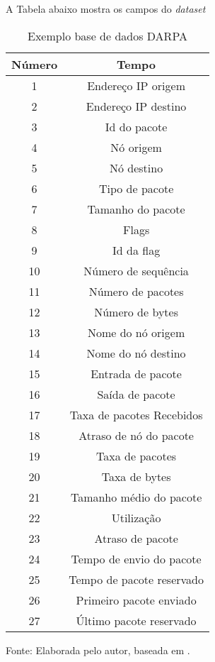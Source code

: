 A Tabela abaixo mostra os campos do \textit{dataset} 

\begin{table}[!b]
	\centering
	\begin{threeparttable}
		\caption{Exemplo base de dados DARPA}
		\label{Tab:DataMining}
		\begin{tabular}{c c }
			\toprule
			\textbf{Número} & \textbf{Tempo}
			\\ \midrule
			1 &  Endereço IP origem  \\ \midrule
			2 &  Endereço IP destino  \\ \midrule
			3 &  Id do pacote  \\ \midrule
			4 &  Nó origem  \\ \midrule
			5 &  Nó destino  \\ \midrule
			6 &  Tipo de pacote  \\ \midrule
			7 &  Tamanho do pacote  \\ \midrule
			8 &  Flags  \\ \midrule
			9 &   Id da flag  \\ \midrule
			10 &  Número de sequência  \\ \midrule
			11 &  Número de pacotes  \\ \midrule
			12 &  Número de bytes  \\ \midrule
			13 &  Nome do nó origem  \\ \midrule
			14 &  Nome do nó destino  \\ \midrule
			15 &  Entrada de pacote  \\ \midrule
			16 &  Saída de pacote  \\ \midrule
			17 &  Taxa de pacotes Recebidos \\ \midrule%
			18 &  Atraso de nó do pacote  \\ \midrule
			19 &  Taxa de pacotes\\ \midrule
			20 &  Taxa de bytes  \\ \midrule
			21 &  Tamanho  médio do pacote  \\ \midrule
			22 &  Utilização  \\ \midrule
			23 &  Atraso de pacote  \\ \midrule
			24 &  Tempo de envio do pacote  \\ \midrule
			25 &  Tempo de pacote reservado  \\ \midrule
			26 &  Primeiro pacote enviado  \\ \midrule
			27 &  Último pacote reservado \\ \bottomrule
		\end{tabular}
		{Fonte: Elaborada pelo autor, baseada em \cite{DataMining}.}
	\end{threeparttable}
\end{table}

